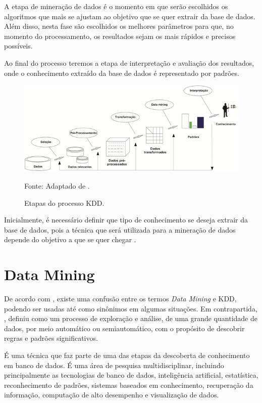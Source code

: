 \documentclass[
	12pt,				%
	openright,			%
	oneside,	
	a4paper,				%
	english,				%
	brazil				%
]{abntex2/abntex2} %
\begin{document}
	A etapa de mineração de dados é o momento em que serão escolhidos os  algoritmos que mais se ajustam ao objetivo que se quer extrair da base de dados. Além disso, nesta fase são escolhidos os melhores parâmetros para que, no momento do processamento, os resultados sejam os mais rápidos e precisos possíveis.
	
	Ao final do processo teremos a etapa de interpretação e avaliação dos resultados, onde o conhecimento extraído da base de dados é representado por padrões.
\\
		\begin{figure}[h!]
			\caption{\label{figDataMiningFayyad} Etapas do processo KDD.}
			\begin{center}
			    \includegraphics[scale=1]{img/dataMiningFayyad.png}
			\end{center}
			Fonte: Adaptado de \cite{fayyad:1996}.
		\end{figure}
		
		Inicialmente, é necessário definir que tipo de conhecimento se deseja extrair da base de dados, pois a técnica que será utilizada para a mineração de dados depende do objetivo a que se quer chegar \cite{damasceno:2005}.
		
	\section{Data Mining}
	
		De acordo com \cite{adriaans:1996}, existe uma confusão entre os termos \textit{Data Mining} e KDD, podendo ser usadas até como sinônimos em algumas situações. Em contrapartida, \cite{berry:1997}, definiu como um processo de exploração e análise, de uma grande quantidade de dados, por meio automático ou semiautomático, com o propósito de descobrir regras e padrões significativos.
		
		É uma técnica que faz parte de uma das etapas da descoberta de conhecimento em banco de dados. É uma área de pesquisa multidisciplinar, incluindo principalmente as tecnologias de banco de dados, inteligência artificial, estatística, reconhecimento de padrões, sistemas baseados em conhecimento, recuperação da informação, computação de alto desempenho e visualização de dados.
		
\end{document}
